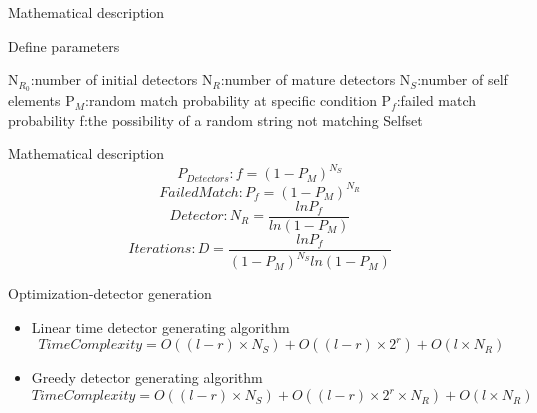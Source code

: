 \begin{frame}{Mathematical description}
 \begin{algorithm}[H]
  \caption{Define parameters}          
    \begin{algorithmic}  
       \STATE N$_{R_0}$:number of initial detectors
       \STATE N$_{R}$:number of mature detectors 
       \STATE N$_{S}$:number of self elements
       \STATE P$_{M}$:random match probability at specific condition
       \STATE P$_{f}$:failed match probability
       \STATE f:the possibility of a random string not matching Selfset
    \end{algorithmic}
  \end{algorithm} 
\end{frame}

\begin{frame}{Mathematical description}
  \begin{equation}
     P_{Detectors}: f=(1-P_{M})^{N_{S}}
  \end{equation}
  \begin{equation}
     FailedMatch:P_f=(1-P_{M})^{N_{R}}
  \end{equation}
  \begin{equation}
     Detector:N_R=\frac{lnP_f}{ln(1-P_M)}
  \end{equation}
  \begin{equation}
     Iterations:D=\frac{lnP_f}{(1-P_{M})^{N_{S}}ln(1-P_M)}
  \end{equation}
  
\end{frame}

\begin{frame}{Optimization-detector generation}
   \begin{itemize}
      \item {
    Linear time detector generating algorithm
      \begin{equation}
        TimeComplexity=O((l-r)\times{N_S})+O((l-r)\times{2^r})+O(l\times{N_R})
      \end{equation}
    }
      \item {
    Greedy detector generating algorithm
     \begin{equation}
        TimeComplexity=O((l-r)\times{N_S})+O((l-r)\times{2^r}\times{N_R})+O(l\times{N_R})
     \end{equation}
    }
  \end{itemize}
\end{frame}


